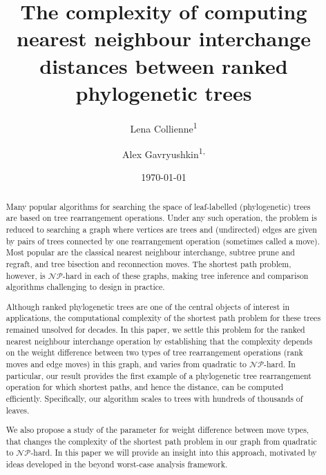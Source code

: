 \documentclass[11pt]{amsart}
\title[Computing $\rnni$ distance]{The complexity of computing nearest neighbour interchange distances between ranked phylogenetic trees}
\date{\today}
\author{Lena Collienne\textsuperscript{1}}
\author{Alex Gavryushkin\textsuperscript{1, \Letter}}
\newcommand{\np}{\mathcal{NP}}
\begin{document}
\begin{abstract}
Many popular algorithms for searching the space of leaf-labelled (phylogenetic) trees are based on tree rearrangement operations.
Under any such operation, the problem is reduced to searching a graph where vertices are trees and (undirected) edges are given by pairs of trees connected by one rearrangement operation (sometimes called a move).
Most popular are the classical nearest neighbour interchange, subtree prune and regraft, and tree bisection and reconnection moves.
The shortest path problem, however, is $\np$-hard in each of these graphs, making tree inference and comparison algorithms challenging to design in practice.

Although ranked phylogenetic trees are one of the central objects of interest in applications, the computational complexity of the shortest path problem for these trees remained unsolved for decades.
In this paper, we settle this problem for the ranked nearest neighbour interchange operation by establishing that the complexity depends on the weight difference between two types of tree rearrangement operations (rank moves and edge moves) in this graph, and varies from quadratic to $\np$-hard.
In particular, our result provides the first example of a phylogenetic tree rearrangement operation for which shortest paths, and hence the distance, can be computed efficiently.
Specifically, our algorithm scales to trees with hundreds of thousands of leaves.

We also propose a study of the parameter for weight difference between move types, that changes the complexity of the shortest path problem in our graph from quadratic to $\np$-hard.
In this paper we will provide an insight into this approach, motivated by ideas developed in the beyond worst-case analysis framework.
\end{abstract}


\maketitle
\thispagestyle{empty}

\newpage

\setcounter{page}{1}
\end{document}
